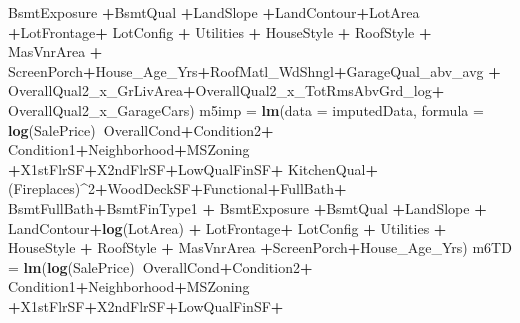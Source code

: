\documentclass[
]{article}
\newenvironment{Shaded}{\begin{snugshade}}{\end{snugshade}}
\newcommand{\DataTypeTok}[1]{\textcolor[rgb]{0.13,0.29,0.53}{#1}}
\newcommand{\DecValTok}[1]{\textcolor[rgb]{0.00,0.00,0.81}{#1}}
\newcommand{\KeywordTok}[1]{\textcolor[rgb]{0.13,0.29,0.53}{\textbf{#1}}}
\newcommand{\NormalTok}[1]{#1}
\newcommand{\OperatorTok}[1]{\textcolor[rgb]{0.81,0.36,0.00}{\textbf{#1}}}
\newcommand{\StringTok}[1]{\textcolor[rgb]{0.31,0.60,0.02}{#1}}
\begin{document}
\begin{Shaded}
\begin{Highlighting}[]
{{{{{{{{{{{{{{{{{{{{{{{{{{{{{{{{{{{{{{{{{{{{{{{{{{{{{{{{{{{{{{{{{{{{{{{{{{{{{{{{{{{{{{{{\StringTok{           }\NormalTok{BsmtExposure }\OperatorTok{+}\NormalTok{BsmtQual }\OperatorTok{+}\NormalTok{LandSlope }\OperatorTok{+}\NormalTok{LandContour}\OperatorTok{+}\NormalTok{LotArea }\OperatorTok{+}\NormalTok{LotFrontage}\OperatorTok{+}\StringTok{ }
\StringTok{           }\NormalTok{LotConfig }\OperatorTok{+}\StringTok{ }\NormalTok{Utilities }\OperatorTok{+}\StringTok{ }\NormalTok{HouseStyle }\OperatorTok{+}\StringTok{ }\NormalTok{RoofStyle }\OperatorTok{+}\StringTok{ }\NormalTok{MasVnrArea }\OperatorTok{+}
\StringTok{           }\NormalTok{ScreenPorch}\OperatorTok{+}\NormalTok{House_Age_Yrs}\OperatorTok{+}\NormalTok{RoofMatl_WdShngl}\OperatorTok{+}\NormalTok{GarageQual_abv_avg }\OperatorTok{+}
\StringTok{           }\NormalTok{OverallQual2_x_GrLivArea}\OperatorTok{+}\NormalTok{OverallQual2_x_TotRmsAbvGrd_log}\OperatorTok{+}
\StringTok{           }\NormalTok{OverallQual2_x_GarageCars) }
\NormalTok{m5imp =}\StringTok{ }\KeywordTok{lm}\NormalTok{(}\DataTypeTok{data =}\NormalTok{ imputedData, }\DataTypeTok{formula =} \KeywordTok{log}\NormalTok{(SalePrice)}\OperatorTok{~}\NormalTok{OverallCond}\OperatorTok{+}\NormalTok{Condition2}\OperatorTok{+}
\StringTok{             }\NormalTok{Condition1}\OperatorTok{+}\NormalTok{Neighborhood}\OperatorTok{+}\NormalTok{MSZoning }\OperatorTok{+}\NormalTok{X1stFlrSF}\OperatorTok{+}\NormalTok{X2ndFlrSF}\OperatorTok{+}\NormalTok{LowQualFinSF}\OperatorTok{+}
\StringTok{             }\NormalTok{KitchenQual}\OperatorTok{+}\NormalTok{(Fireplaces)}\OperatorTok{^}\DecValTok{2}\OperatorTok{+}\NormalTok{WoodDeckSF}\OperatorTok{+}\NormalTok{Functional}\OperatorTok{+}\NormalTok{FullBath}\OperatorTok{+}
\StringTok{             }\NormalTok{BsmtFullBath}\OperatorTok{+}\NormalTok{BsmtFinType1 }\OperatorTok{+}\StringTok{ }\NormalTok{BsmtExposure }\OperatorTok{+}\NormalTok{BsmtQual }\OperatorTok{+}\NormalTok{LandSlope }\OperatorTok{+}
\StringTok{             }\NormalTok{LandContour}\OperatorTok{+}\KeywordTok{log}\NormalTok{(LotArea) }\OperatorTok{+}\StringTok{ }\NormalTok{LotFrontage}\OperatorTok{+}\StringTok{ }\NormalTok{LotConfig }\OperatorTok{+}\StringTok{ }\NormalTok{Utilities }\OperatorTok{+}\StringTok{ }
\StringTok{             }\NormalTok{HouseStyle }\OperatorTok{+}\StringTok{ }\NormalTok{RoofStyle }\OperatorTok{+}\StringTok{ }\NormalTok{MasVnrArea }\OperatorTok{+}\NormalTok{ScreenPorch}\OperatorTok{+}\NormalTok{House_Age_Yrs) }
\NormalTok{m6TD =}\StringTok{ }\KeywordTok{lm}\NormalTok{(}\KeywordTok{log}\NormalTok{(SalePrice)}\OperatorTok{~}\NormalTok{OverallCond}\OperatorTok{+}\NormalTok{Condition2}\OperatorTok{+}
\StringTok{            }\NormalTok{Condition1}\OperatorTok{+}\NormalTok{Neighborhood}\OperatorTok{+}\NormalTok{MSZoning }\OperatorTok{+}\NormalTok{X1stFlrSF}\OperatorTok{+}\NormalTok{X2ndFlrSF}\OperatorTok{+}\NormalTok{LowQualFinSF}\OperatorTok{+}
}}}}}}}}}}}}}}}}}}}}}}}}}}}}}}}}}}}}}}}}}}}}}}}}}}}}}}}}}}}}}}}}}}}}}}}}}}}}}}}}}}}}}}}}
\end{Highlighting}
\end{Shaded}
\end{document}

